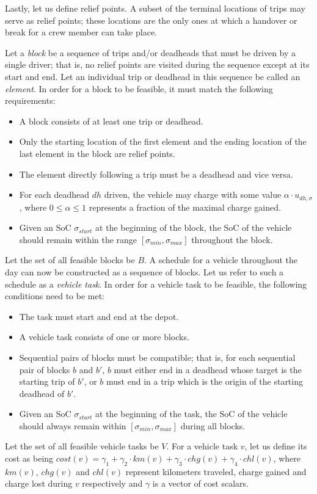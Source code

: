 \documentclass[]{article}
\begin{document}
Lastly, let us define relief points. A subset of the terminal locations of trips may serve as relief points; these locations are the only ones at which a handover or break for a crew member can take place.

Let a \textit{block} be a sequence of trips and/or deadheads that must be driven by a single driver; that is, no relief points are visited during the sequence except at its start and end. Let an individual trip or deadhead in this sequence be called an \textit{element}. In order for a block to be feasible, it must match the following requirements: 
\begin{itemize}
  \item A block consists of at least one trip or deadhead.
  \item Only the starting location of the first element and the ending location of the last element in the block are relief points.
  \item The element directly following a trip must be a deadhead and vice versa. 
  \item For each deadhead $dh$ driven, the vehicle may charge with some value $\alpha \cdot u_{dh,\sigma}$, where $0 \leq \alpha \leq 1$ represents a fraction of the maximal charge gained. 
  \item Given an SoC $\sigma_{start}$ at the beginning of the block, the SoC of the vehicle should remain within the range $[ \sigma_{min}, \sigma_{max} ]$ throughout the block.
\end{itemize}
Let the set of all feasible blocks be $B$. A schedule for a vehicle throughout the day can now be constructed as a sequence of blocks. Let us refer to such a schedule as a \textit{vehicle task}. In order for a vehicle task to be feasible, the following conditions need to be met:
\begin{itemize}
  \item The task must start and end at the depot. 
  \item A vehicle task consists of one or more blocks. 
  \item Sequential pairs of blocks must be compatible; that is, for each sequential pair of blocks $b$ and $b'$, $b$ must either end in a deadhead whose target is the starting trip of $b'$, or $b$ must end in a trip which is the origin of the starting deadhead of $b'$.
  \item Given an SoC $\sigma_{start}$ at the beginning of the task, the SoC of the vehicle should always remain within $[ \sigma_{min}, \sigma_{max} ]$ during all blocks.
\end{itemize}
Let the set of all feasible vehicle tasks be $V$. For a vehicle task $v$, let us define its cost as being $cost(v) = \gamma_1 + \gamma_2 \cdot km(v) + \gamma_3 \cdot chg(v) + \gamma_4 \cdot chl(v)$, where $km(v)$, $chg(v)$ and $chl(v)$ represent kilometers traveled, charge gained and charge lost during $v$ respectively and $\gamma$ is a vector of cost scalars.
\end{document}
